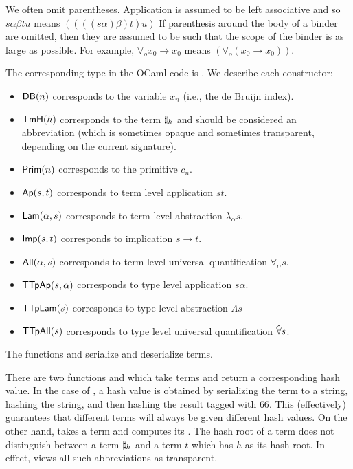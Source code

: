 We often omit parentheses.
Application is assumed to be left associative
and so $s\alpha\beta t u$ means $((((s\alpha)\beta)t)u)$
If parenthesis around the body
of a binder
are omitted, then they are assumed to be such that the
scope of the binder is as large as possible.
For example, $\forall_o x_0\to x_0$ means
$(\forall_o (x_0\to x_0))$.

The corresponding type in the OCaml code is {}.
We describe each constructor:
\begin{itemize}
\item ${\mbox{\constr{DB}}}(n)$ corresponds to the variable $x_n$  (i.e., the de Bruijn index).
\item ${\mbox{\constr{TmH}}}(h)$ corresponds to the term $\mathbf{\sharp}_{h}$
and should be considered an abbreviation (which is sometimes opaque and sometimes transparent, depending on the current signature).
\item ${\mbox{\constr{Prim}}}(n)$ corresponds to the primitive $c_n$.
\item ${\mbox{\constr{Ap}}}(s,t)$ corresponds to term level application $st$.
\item ${\mbox{\constr{Lam}}}(\alpha,s)$ corresponds to term level abstraction $\lambda_\alpha s$.
\item ${\mbox{\constr{Imp}}}(s,t)$ corresponds to implication $s\to t$.
\item ${\mbox{\constr{All}}}(\alpha,s)$ corresponds to term level universal quantification $\forall_\alpha s$.
\item ${\mbox{\constr{TTpAp}}}(s,\alpha)$ corresponds to type level application $s\alpha$.
\item ${\mbox{\constr{TTpLam}}}(s)$ corresponds to type level abstraction $\Lambda s$
\item ${\mbox{\constr{TTpAll}}}(s)$ corresponds to type level universal quantification $\hat{\forall} s$.
\end{itemize}

The functions {} and {} serialize and deserialize terms.

There are two functions {} 
and
{} which take terms and return
a corresponding hash value.
In the case of {},
a hash value is obtained by serializing the term
to a string, hashing the string, and then hashing the result tagged with $66$.
This (effectively) guarantees that different terms
will always be given different hash values.
On the other hand, {} takes a term and computes its {}.
The hash root of a term does not distinguish between a term
$\mathbf{\sharp}_{h}$ and a term $t$ which has $h$ as its hash root.
In effect, {} views all such abbreviations
as transparent.


